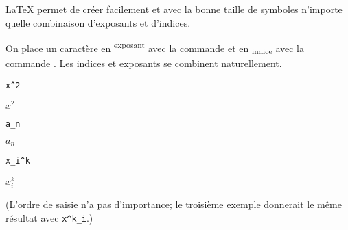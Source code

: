 {\LaTeX} permet de créer facilement et avec la bonne taille de
symboles n'importe quelle combinaison d'exposants et d'indices.

On place un caractère en \textsuperscript{exposant} avec la
commande \cmd{^} et en \textsubscript{indice} avec la commande
\cmd{_}. Les indices et exposants se combinent naturellement.
\begin{demo}
  \def\strut{\rule[-0.4ex]{0pt}{2ex}}
  \begin{minipage}{0.3\linewidth}
    \begin{texample}[0.6\linewidth]
\begin{lstlisting}
x^2
\end{lstlisting}
      \producing\strut $x^2$
    \end{texample}
  \end{minipage}
  \quad
  \begin{minipage}{0.3\linewidth}
    \begin{texample}[0.6\linewidth]
\begin{lstlisting}
a_n
\end{lstlisting}
      \producing\strut $a_n$
    \end{texample}
  \end{minipage}
  \quad
  \begin{minipage}{0.3\linewidth}
    \begin{texample}[0.67\linewidth]
\begin{lstlisting}
x_i^k
\end{lstlisting}
      \producing\strut $x_i^k$
    \end{texample}
  \end{minipage}
\end{demo}
(L'ordre de saisie n'a pas d'importance; le troisième exemple
donnerait le même résultat avec \verb=x^k_i=.)

